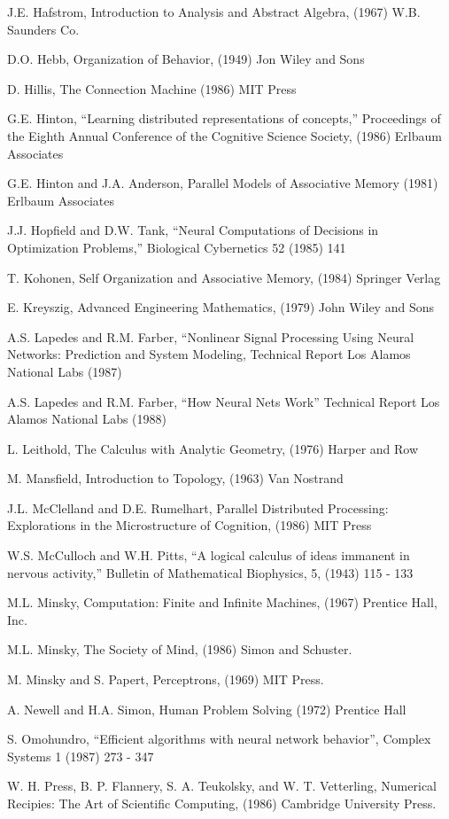J.E. Hafstrom, Introduction to Analysis and Abstract Algebra, (1967)
W.B. Saunders Co.

D.O. Hebb, Organization of Behavior, (1949) Jon Wiley and Sons

D. Hillis, The Connection Machine (1986) MIT Press

G.E. Hinton, ``Learning distributed representations of concepts,''
Proceedings of the Eighth Annual Conference of the Cognitive Science
Society, (1986) Erlbaum Associates

G.E. Hinton and J.A. Anderson, Parallel Models of Associative Memory
(1981) Erlbaum Associates

J.J. Hopfield and D.W. Tank, ``Neural Computations of Decisions in
Optimization Problems,'' Biological Cybernetics 52 (1985) 141

T. Kohonen, Self Organization and Associative Memory, (1984) Springer
Verlag 

E. Kreyszig, Advanced Engineering Mathematics, (1979) John Wiley and Sons

A.S. Lapedes and R.M. Farber, ``Nonlinear Signal Processing Using
Neural Networks: Prediction and System Modeling, Technical Report Los
Alamos National Labs (1987)

A.S. Lapedes and R.M. Farber, ``How Neural Nets Work'' Technical
Report Los Alamos National Labs (1988)

L. Leithold, The Calculus with Analytic Geometry, (1976) Harper and Row

M. Mansfield, Introduction to Topology, (1963) Van Nostrand

J.L. McClelland and D.E. Rumelhart, Parallel Distributed Processing:
Explorations in the Microstructure of Cognition, (1986) MIT Press

W.S. McCulloch and W.H. Pitts, ``A logical calculus of ideas immanent
in nervous activity,'' Bulletin of Mathematical Biophysics, 5, (1943)
115 - 133

M.L. Minsky, Computation: Finite and Infinite Machines, (1967)
Prentice Hall, Inc.

M.L. Minsky, The Society of Mind, (1986) Simon and Schuster.

M. Minsky and S. Papert, Perceptrons, (1969) MIT Press.

A. Newell and H.A. Simon, Human Problem Solving (1972) Prentice Hall

S. Omohundro, ``Efficient algorithms with neural network behavior'',
Complex Systems 1 (1987) 273 - 347

W. H. Press, B. P. Flannery, S. A. Teukolsky, and W. T.
Vetterling, Numerical Recipies: The Art of Scientific Computing,
(1986) Cambridge University Press.

